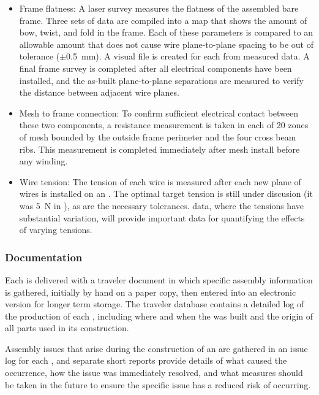 \begin{itemize}
\item Frame flatness: A laser survey measures the flatness of the assembled bare frame. Three sets of data are compiled into a map that shows the amount of bow, twist, and fold in the frame. Each of these parameters is compared to an allowable amount that does not cause wire plane-to-plane spacing to be out of tolerance ($\pm$\SI{0.5}{mm}).  A visual file is created for each  from measured data. A final frame survey is completed after all electrical components have been installed, and the as-built plane-to-plane separations are measured to verify the distance between adjacent wire planes.
\item Mesh to frame connection: To confirm sufficient electrical contact between these two components, a resistance measurement is taken in each of \num{20} zones of mesh bounded by the outside frame perimeter and the four cross beam ribs. This measurement is completed immediately after mesh install before any winding.
\item Wire tension: The tension of each wire is measured after each new plane of wires is installed on an . The optimal target tension is still under discusion (it was \SI{5}{N} in ), as are the necessary tolerances.   data, where the tensions have substantial variation, will provide important data for quantifying the effects of varying tensions.  
\end{itemize}


\subsubsection{Documentation} 
\label{sec:fdsp-apa-prod-doc}

Each  is delivered with a traveler document in which specific assembly information is gathered, initially by hand on a paper copy, then entered into an electronic version for longer term storage.  The traveler database contains a detailed log of the production of each , including where and when the  was built and the origin of all parts used in its construction. 

Assembly issues that arise during the construction of an  are gathered in an issue log for each , and separate short reports provide details of what caused the occurrence, how the issue was immediately resolved, and what measures should be taken in the future to ensure the specific issue has a reduced risk of occurring.  


